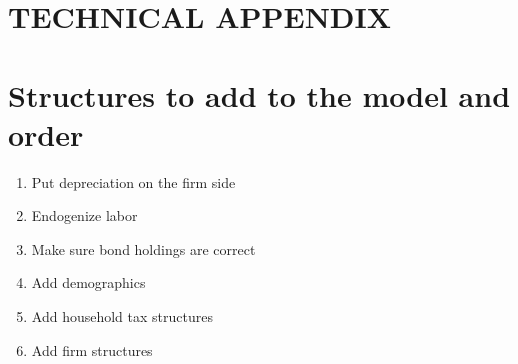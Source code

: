 \documentclass[letterpaper,12pt]{article}
\theoremstyle{definition}
\begin{document}


\newpage




\newpage
\renewcommand{\theequation}{T.\arabic{section}.\arabic{equation}}
\renewcommand{\thesection}{T-\arabic{section}}   %
\setcounter{equation}{0}                         %
\setcounter{section}{0}                          %
\section*{TECHNICAL APPENDIX}


\section{Structures to add to the model and order}\label{TAppSteps}

  \begin{enumerate}
    \item Put depreciation on the firm side
    \item Endogenize labor
    \item Make sure bond holdings are correct
    \item Add demographics
    \item Add household tax structures
    \item Add firm structures
  \end{enumerate}
\end{document}
